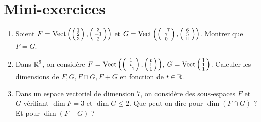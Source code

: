 \section{Mini-exercices}

\begin{frame}
\begin{miniexercice}
\vspace*{-1ex}
\begin{enumerate}
  \item Soient 
  $F = \mathop{\text{Vect}}\nolimits \left( \left(\begin{smallmatrix}1\\2\\3\end{smallmatrix}\right),
  \left(\begin{smallmatrix}3\\-1\\2 \end{smallmatrix}\right)\right)$
  et $G = \mathop{\text{Vect}}\nolimits \left( \left(\begin{smallmatrix}-7\\7\\0\end{smallmatrix}\right),
  \left(\begin{smallmatrix}6\\5\\11 \end{smallmatrix}\right)\right)$.
  Montrer que $F=G$.
  
  \item Dans $\mathbb{R}^3$, on considère 
  $F = \mathop{\text{Vect}}\nolimits \left( \left(\begin{smallmatrix}1\\t\\-1\end{smallmatrix}\right),
  \left(\begin{smallmatrix}t\\1\\1 \end{smallmatrix}\right)\right)$, 
  $G=\mathop{\text{Vect}}\nolimits \left(\begin{smallmatrix}1\\1\\1 \end{smallmatrix}\right)$. Calculer les dimensions
  de $F,G,F\cap G,F+G$ en fonction de $t\in \mathbb{R}$.
  
  \item Dans un espace vectoriel de dimension $7$, on considère des sous-espaces $F$ et $G$ vérifiant
  $\dim F=3$ et $\dim G \le 2$. Que peut-on dire pour $\dim (F\cap G)$ ? Et pour $\dim (F+G)$ ?


\end{enumerate}
\end{miniexercice}
\end{frame}
